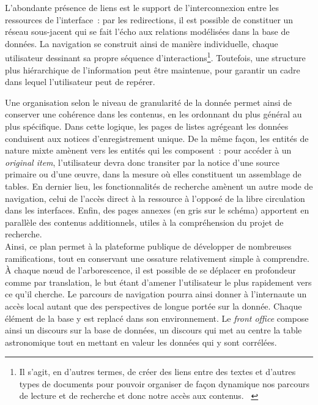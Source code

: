 \documentclass[a4paper,12pt,twoside]{book}
\newcommand{\eng}{\emph}
\newcommand{\oi}{\eng{original item}\xspace}
\newcommand{\bdd}{base de données\xspace}
\newcommand{\g}[1]{\og#1~\fg}
\begin{document}
L'abondante présence de liens est le support de l'interconnexion entre les ressources de l'interface~: par les redirections, il est possible de constituer un réseau sous-jacent qui se fait l'écho aux relations modélisées dans la \bdd. La navigation se construit ainsi de manière individuelle, chaque utilisateur dessinant sa propre séquence d'interactions\footnote{\g{Il s’agit, en d’autres termes, de créer des liens entre des textes et d’autres types de documents pour pouvoir organiser de façon dynamique nos parcours de lecture et de recherche et donc notre accès aux contenus.} \cite[§~6]{sinatraChapitreHistoireHumanites2014}}. Toutefois, une structure plus hiérarchique de l'information peut être maintenue, pour garantir un cadre dans lequel l'utilisateur peut de repérer.

Une organisation selon le niveau de granularité de la donnée permet ainsi de conserver une cohérence dans les contenus, en les ordonnant du plus général au plus spécifique. Dans cette logique, les pages de listes agrégeant les données conduisent aux notices d'enregistrement unique. De la même façon, les entités de nature mixte amènent vers les entités qui les composent~: pour accéder à un \oi, l'utilisateur devra donc transiter par la notice d'une source primaire ou d'une œuvre, dans la mesure où elles constituent un assemblage de tables. En dernier lieu, les fonctionnalités de recherche amènent un autre mode de navigation, celui de l'accès direct à la ressource à l'opposé de la libre circulation dans les interfaces. Enfin, des pages annexes (en gris sur le schéma) apportent en parallèle des contenus additionnels, utiles à la compréhension du projet de recherche.\\

Ainsi, ce plan permet à la plateforme publique de développer de nombreuses ramifications, tout en conservant une ossature relativement simple à comprendre. À chaque nœud de l'arborescence, il est possible de se déplacer en profondeur comme par translation, le but étant d'amener l'utilisateur le plus rapidement vers ce qu'il cherche. Le parcours de navigation pourra ainsi donner à l'internaute un accès local autant que des perspectives de longue portée sur la donnée. Chaque élément de la base y est replacé dans son environnement. Le \eng{front office} compose ainsi un discours sur la \bdd, un discours qui met au centre la table astronomique tout en mettant en valeur les données qui y sont corrélées.\\
\end{document}
